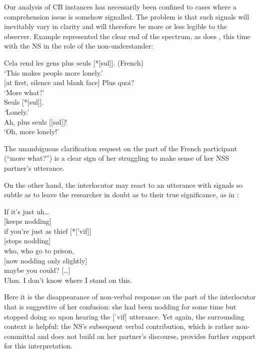\documentclass[output=paper,colorlinks,citecolor=brown,modfonts,nonflat]{../langscibook}
\begin{document}
Our analysis of CB instances has necessarily been confined to cases where a comprehension issue is somehow signalled. The problem is that such signals will inevitably vary in clarity and will therefore be more or less legible to the observer. Example  represented the clear end of the spectrum, as does , this time with the NS in the role of the non-understander:

\ea\label{ex:scheuer:15}
{\NNS} {Cela} {rend} {les} {gens} {plus} {seuls} [*[sul]].    (French)\\
‘This makes people more lonely.’\\
{\NS} [at first, silence and blank face] {Plus} {quoi?}\\
  ‘More what?’\\
  {\NNS} {Seuls} [*[sul]].\\
  \textit{‘}Lonely.’\\
  {\NS} {Ah,} {plus} {seuls} [[søl]]!\\
  ‘Oh, more lonely!’
\z

The unambiguous clarification request on the part of the French participant (“more what?”) is a clear sign of her struggling to make sense of her NSS partner’s utterance.

On the other hand, the interlocutor may react to an utterance with signals so subtle as to leave the researcher in doubt as to their true significance, as in : 

\ea\label{ex:scheuer:16}
{\NNS} {If} {it’s} {just} {uh…}\\
{\NS} [keeps nodding] \\
{\NNS} {if} {you’re} {just} {as} {thief} [*[{}'vif]]\\
{\NS} [stops nodding]\\
{\NNS} {who,} {who} {go} {to} {prison,}\\
{\NS} [now nodding only slightly]\\
{\NNS} {maybe} {you} {could?} {[…]}\\
{\NS} {Uhm.} {I} {don’t} {know} {where} {I} {stand} {on} {this.}
\z

Here it is the disappearance of non-verbal response on the part of the interlocutor that is suggestive of her confusion: she had been nodding for some time but stopped doing so upon hearing the [ˈvif] utterance. Yet again, the surrounding context is helpful: the NS’s subsequent verbal contribution, which is rather non-committal and does not build on her partner’s discourse, provides further support for this interpretation.
\end{document}
